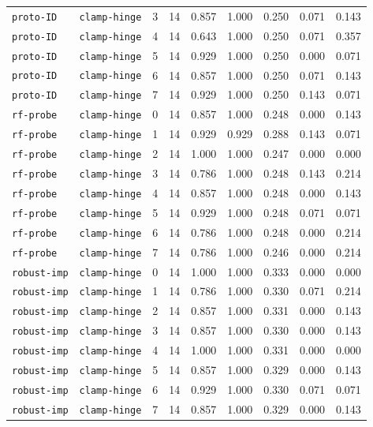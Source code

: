 \documentclass{article}
\begin{document}
\begin{center}
{\begin{tabular}{llllccccc}
\texttt{proto-ID} & \texttt{clamp-hinge} & 3 & 14 & 0.857 & 1.000 & 0.250 & 0.071 & 0.143 \\
\texttt{proto-ID} & \texttt{clamp-hinge} & 4 & 14 & 0.643 & 1.000 & 0.250 & 0.071 & 0.357 \\
\texttt{proto-ID} & \texttt{clamp-hinge} & 5 & 14 & 0.929 & 1.000 & 0.250 & 0.000 & 0.071 \\
\texttt{proto-ID} & \texttt{clamp-hinge} & 6 & 14 & 0.857 & 1.000 & 0.250 & 0.071 & 0.143 \\
\texttt{proto-ID} & \texttt{clamp-hinge} & 7 & 14 & 0.929 & 1.000 & 0.250 & 0.143 & 0.071 \\
\texttt{rf-probe} & \texttt{clamp-hinge} & 0 & 14 & 0.857 & 1.000 & 0.248 & 0.000 & 0.143 \\
\texttt{rf-probe} & \texttt{clamp-hinge} & 1 & 14 & 0.929 & 0.929 & 0.288 & 0.143 & 0.071 \\
\texttt{rf-probe} & \texttt{clamp-hinge} & 2 & 14 & 1.000 & 1.000 & 0.247 & 0.000 & 0.000 \\
\texttt{rf-probe} & \texttt{clamp-hinge} & 3 & 14 & 0.786 & 1.000 & 0.248 & 0.143 & 0.214 \\
\texttt{rf-probe} & \texttt{clamp-hinge} & 4 & 14 & 0.857 & 1.000 & 0.248 & 0.000 & 0.143 \\
\texttt{rf-probe} & \texttt{clamp-hinge} & 5 & 14 & 0.929 & 1.000 & 0.248 & 0.071 & 0.071 \\
\texttt{rf-probe} & \texttt{clamp-hinge} & 6 & 14 & 0.786 & 1.000 & 0.248 & 0.000 & 0.214 \\
\texttt{rf-probe} & \texttt{clamp-hinge} & 7 & 14 & 0.786 & 1.000 & 0.246 & 0.000 & 0.214 \\
\texttt{robust-imp} & \texttt{clamp-hinge} & 0 & 14 & 1.000 & 1.000 & 0.333 & 0.000 & 0.000 \\
\texttt{robust-imp} & \texttt{clamp-hinge} & 1 & 14 & 0.786 & 1.000 & 0.330 & 0.071 & 0.214 \\
\texttt{robust-imp} & \texttt{clamp-hinge} & 2 & 14 & 0.857 & 1.000 & 0.331 & 0.000 & 0.143 \\
\texttt{robust-imp} & \texttt{clamp-hinge} & 3 & 14 & 0.857 & 1.000 & 0.330 & 0.000 & 0.143 \\
\texttt{robust-imp} & \texttt{clamp-hinge} & 4 & 14 & 1.000 & 1.000 & 0.331 & 0.000 & 0.000 \\
\texttt{robust-imp} & \texttt{clamp-hinge} & 5 & 14 & 0.857 & 1.000 & 0.329 & 0.000 & 0.143 \\
\texttt{robust-imp} & \texttt{clamp-hinge} & 6 & 14 & 0.929 & 1.000 & 0.330 & 0.071 & 0.071 \\
\texttt{robust-imp} & \texttt{clamp-hinge} & 7 & 14 & 0.857 & 1.000 & 0.329 & 0.000 & 0.143 \\
\bottomrule
\end{tabular}%
}
\end{center}
\end{document}
